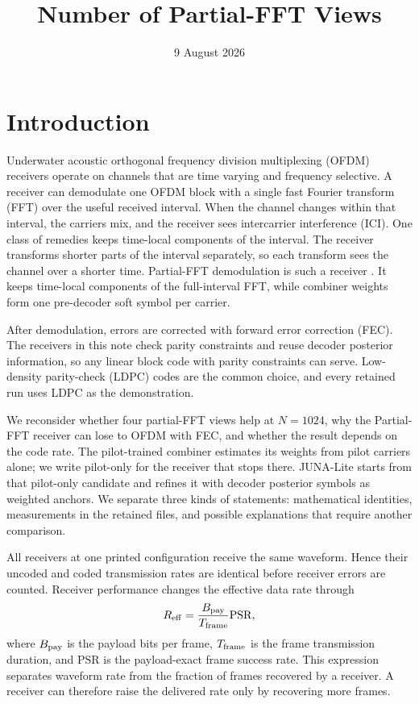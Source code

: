 \documentclass[11pt]{article}
\title{Number of Partial-FFT Views}
\author{}
\date{9 August 2026}
\newcommand{\PSR}{\mathrm{PSR}}
\begin{document}
\maketitle

\section{Introduction}

Underwater acoustic orthogonal frequency division multiplexing (OFDM)
receivers operate on channels that are time varying and frequency selective.
A receiver can demodulate one OFDM block with a single fast Fourier
transform (FFT) over the useful received interval.  When the channel changes
within that interval, the carriers mix, and the receiver sees intercarrier
interference (ICI).  One class of remedies keeps time-local components of
the interval.  The receiver transforms shorter parts of the interval
separately, so each transform sees the channel over a shorter time.
Partial-FFT demodulation is such a receiver \cite{yerramalli}.  It keeps
time-local components of the full-interval FFT, while combiner weights form
one pre-decoder soft symbol per carrier.

After demodulation, errors are corrected with forward error correction
(FEC).  The receivers in this note check parity constraints and reuse
decoder posterior information, so any linear block code with parity
constraints can serve.  Low-density parity-check (LDPC) codes are the common
choice, and every retained run uses LDPC as the demonstration.

We reconsider whether four partial-FFT views help at $N=1024$, why the
Partial-FFT receiver can lose to OFDM with FEC, and whether the result
depends on the code rate.  The pilot-trained combiner estimates its weights
from pilot carriers alone; we write pilot-only for the receiver that stops
there.  JUNA-Lite starts from that pilot-only candidate and refines it with
decoder posterior symbols as weighted anchors.  We separate three kinds of
statements: mathematical identities, measurements in the retained files,
and possible explanations that require another comparison.

All receivers at one printed configuration receive the same waveform.
Hence their uncoded and coded transmission rates are identical before receiver
errors are counted.  Receiver performance changes the effective data rate
through
\begin{equation}
  R_{\rm eff}
  =
  \frac{B_{\rm pay}}{T_{\rm frame}}\PSR,
  \label{eq:effective-rate}
\end{equation}
where $B_{\rm pay}$ is the payload bits per frame, $T_{\rm frame}$ is the
frame transmission duration, and $\PSR$ is the payload-exact frame success
rate.  This expression separates waveform rate from the fraction of frames
recovered by a receiver.  A receiver can therefore raise the delivered rate
only by recovering more frames.
\end{document}

